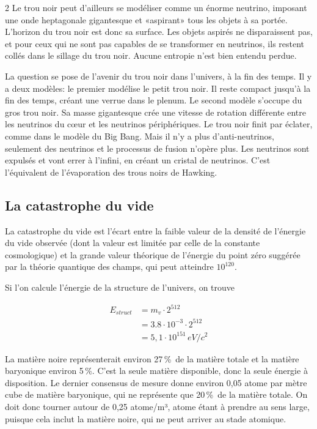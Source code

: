\begin{multicols}{2}
Le trou noir peut d'ailleurs se modéliser comme un énorme neutrino,
imposant une onde heptagonale gigantesque et «aspirant» tous les
objets à sa portée. L'horizon du trou noir est donc sa surface. Les
objets aspirés ne disparaissent pas, et pour ceux qui ne sont pas
capables de se transformer en neutrinos, ils restent collés dans le sillage
du trou noir. Aucune entropie n'est bien entendu perdue.

La question se pose de l'avenir du trou noir dans l'univers, à la fin
des temps. Il y a deux modèles: le premier modélise le petit trou
noir. Il reste compact jusqu'à la fin des temps, créant une verrue
dans le plenum. Le second modèle s'occupe du gros trou noir. Sa masse
gigantesque crée une vitesse de rotation différente entre les
neutrinos du cœur et les neutrinos périphériques. Le trou noir finit
par éclater, comme dans le modèle du Big Bang. Mais il n'y a plus
d'anti-neutrinos, seulement des neutrinos et le processus de fusion
n'opère plus. Les neutrinos sont expulsés et vont errer à l'infini, en
créant un cristal de neutrinos. C'est l'équivalent de l'évaporation
des trous noirs de Hawking. \cite{hawking1975particle}

\subsection{La catastrophe du vide}

La catastrophe du vide est l'écart entre la faible valeur de
la densité de l'énergie du vide observée (dont la valeur est limitée par celle
de la constante cosmologique) et la grande valeur théorique de
l'énergie du point zéro suggérée par la théorie quantique des champs,
qui peut atteindre $10^{120}$.

Si l'on calcule l'énergie de la structure de l'univers, on trouve

\begin{equation*}
	\begin{split}
	E_{struct} &= m_v \cdot 2^{512} \\
	           &= 3.8 \cdot 10^{-3} \cdot 2^{512} \\
	           &= 5,1 \cdot 10^{151}\,eV/c^2
	\end{split}
\end{equation*}

La matière noire représenterait environ 27\,\%\ de la matière totale et la matière baryonique environ 5\,\%. C'est la seule matière disponible, donc la seule énergie à disposition. Le dernier consensus de mesure donne environ 0,05 atome par mètre cube de matière baryonique, qui ne représente que 20\,\%\ de la matière totale. On doit donc tourner autour de 0,25 atome/m³, atome étant à prendre au sens large, puisque cela inclut la matière noire, qui ne peut arriver au stade atomique.


\end{multicols}

